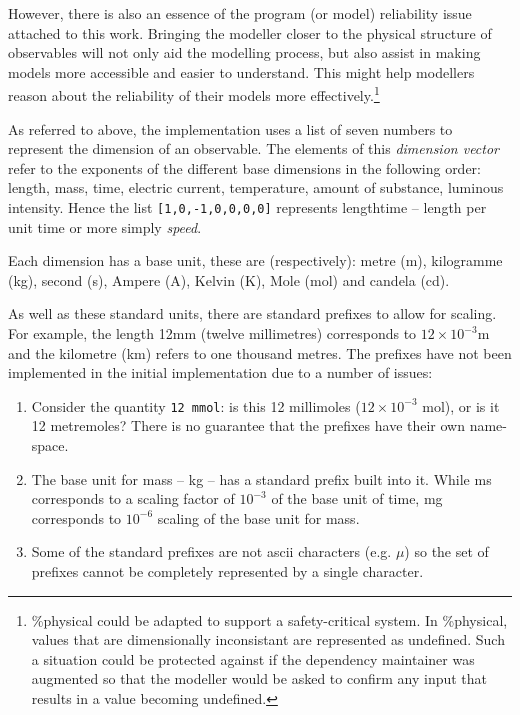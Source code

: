 \documentclass[a4paper]{article}
\begin{document}
However, there is also an essence of the program (or model) reliability issue 
attached
to this work. Bringing the modeller closer to the physical
structure of observables will not only aid the modelling process, but also 
assist in
making models more accessible and easier to understand. This might help 
modellers reason about the reliability of their models more 
effectively.\footnote{
\%physical could be adapted to support 
a safety-critical system. In \%physical, values that are dimensionally 
inconsistant are
represented as undefined. Such a situation could be protected against if the
dependency maintainer was augmented 
so that the modeller would be asked to confirm any input 
that results in a value becoming undefined.}

As referred to above, the implementation uses a list of seven numbers to 
represent the dimension of an observable. The elements of this \emph{dimension
vector} refer to the exponents of the different base dimensions in the 
following order:
length, mass, time, electric current, temperature,
amount of substance, luminous intensity. Hence the list
 \texttt{[1,0,-1,0,0,0,0]} represents 
length\textbullet time\raisebox{1ex}{\small -1} -- length per unit time or 
more simply \emph{speed}.

Each dimension has a base unit, these are (respectively): metre (m),
kilogramme (kg), second (s), Ampere (A), Kelvin (K), Mole (mol) and candela 
(cd).

As well as these standard units, there are standard prefixes to allow for 
scaling. For example, the length 12mm (twelve millimetres) 
corresponds to $12\times10^{-3}$m and the kilometre (km) refers to one 
thousand metres. The prefixes have not been implemented in the initial 
implementation due to a number of issues:

\begin{enumerate}
\item Consider the quantity \texttt{12 mmol}: is this 12 millimoles 
($12\times10^{-3}$ mol), 
or is it 12 metre\textbullet moles? There is no guarantee that the prefixes 
have their own name-space.
\item The base unit for mass -- kg -- has a standard prefix built into it. 
While ms corresponds to
a scaling factor of $10^{-3}$ of the base unit of time, mg corresponds to 
$10^{-6}$ scaling of the base unit for mass.
\item Some of the standard prefixes are not ascii characters (e.g. $\mu$) so 
the set of prefixes cannot
be completely represented by a single character. 
\end{enumerate}
\end{document}
